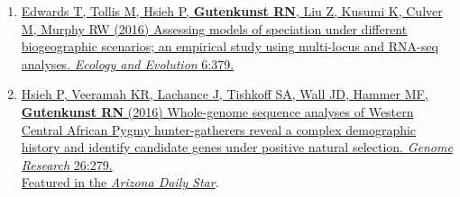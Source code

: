 \documentclass[11pt]{article}
\newcommand{\dadi}{dadi\xspace}
\begin{document}
\begin{enumerate}
\item \href{http://doi.org/10.1002/ece3.1865}{Edwards T\corresponding, Tollis M, Hsieh P\trainee,  \textbf{Gutenkunst RN}, Liu Z, Kusumi K, Culver M, Murphy RW (2016) Assessing models of speciation under different biogeographic scenarios; an empirical study using multi-locus and RNA-seq analyses. \emph{Ecology and Evolution} 6:379.}

\item \href{http://doi.org/10.1101/gr.192971.115}{Hsieh P\trainee, Veeramah KR, Lachance J, Tishkoff SA, Wall JD, Hammer MF\corresponding, \textbf{Gutenkunst RN}\corresponding
(2016) Whole-genome sequence analyses of Western Central African Pygmy hunter-gatherers reveal a complex demographic history and identify candidate genes under positive natural selection. \emph{Genome Research} 26:279.}\\
  \href{http://tucson.com/news/local/pygmy-research-reveals-genetic-changes-for-new-environments/article_013dfd0b-d443-5a41-a817-cb4802c9617d.html}{Featured in the \emph{Arizona Daily Star}}.


\end{enumerate}
\end{document}
